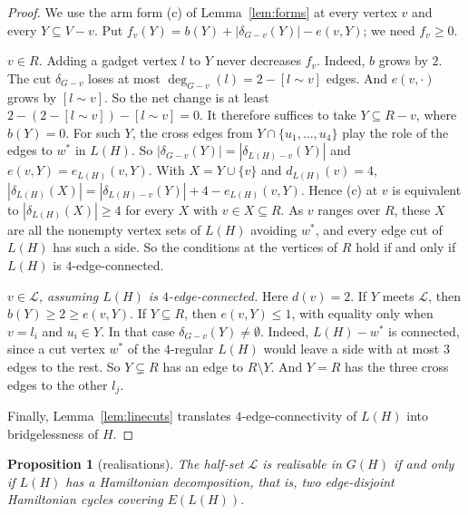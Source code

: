 \documentclass[11pt]{amsart}
\newtheorem{proposition}[theorem]{Proposition}
\theoremstyle{definition}
\begin{document}
\begin{proof}
We use the arm form (c) of Lemma~\ref{lem:forms} at every vertex $v$ and every $Y\subseteq V-v$. Put
$f_v(Y)=b(Y)+|\delta_{G-v}(Y)|-e(v,Y)$; we need $f_v\ge0$.

\emph{$v\in R$.} Adding a gadget vertex $l$ to $Y$ never decreases $f_v$. Indeed, $b$ grows by $2$.
The cut $\delta_{G-v}$ loses at most $\deg_{G-v}(l)=2-[l\sim v]$ edges. And $e(v,\cdot)$ grows by
$[l\sim v]$. So the net change is at least $2-(2-[l\sim v])-[l\sim v]=0$. It therefore suffices to
take $Y\subseteq R-v$, where $b(Y)=0$. For such $Y$, the cross edges from $Y\cap\{u_1,\dots,u_4\}$
play the role of the edges to $w^*$ in $L(H)$. So $|\delta_{G-v}(Y)|=|\delta_{L(H)-v}(Y)|$ and
$e(v,Y)=e_{L(H)}(v,Y)$. With $X=Y\cup\{v\}$ and $d_{L(H)}(v)=4$,
$|\delta_{L(H)}(X)|=|\delta_{L(H)-v}(Y)|+4-e_{L(H)}(v,Y)$. Hence (c) at $v$ is equivalent to
$|\delta_{L(H)}(X)|\ge4$ for every $X$ with $v\in X\subseteq R$. As $v$ ranges over $R$, these $X$
are all the nonempty vertex sets of $L(H)$ avoiding $w^*$, and every edge cut of $L(H)$ has such a
side. So the conditions at the vertices of $R$ hold if and only if $L(H)$ is $4$-edge-connected.

\emph{$v\in\mathcal L$, assuming $L(H)$ is $4$-edge-connected.} Here $d(v)=2$. If $Y$ meets
$\mathcal L$, then $b(Y)\ge2\ge e(v,Y)$. If $Y\subseteq R$, then $e(v,Y)\le1$, with equality only when
$v=l_i$ and $u_i\in Y$. In that case $\delta_{G-v}(Y)\ne\emptyset$. Indeed, $L(H)-w^*$ is connected,
since a cut vertex $w^*$ of the $4$-regular $L(H)$ would leave a side with at most $3$ edges to the
rest. So $Y\subsetneq R$ has an edge to $R\setminus Y$. And $Y=R$ has the three cross edges to the
other $l_j$.

Finally, Lemma~\ref{lem:linecuts} translates $4$-edge-connectivity of $L(H)$ into bridgelessness of
$H$.
\end{proof}

\begin{proposition}[realisations]\label{prop:Lreal}
The half-set $\mathcal L$ is realisable in $G(H)$ if and only if $L(H)$ has a Hamiltonian
decomposition, that is, two edge-disjoint Hamiltonian cycles covering $E(L(H))$.
\end{proposition}
\end{document}

